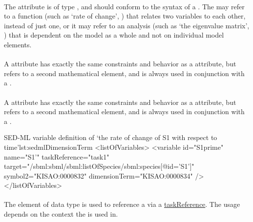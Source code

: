 \paragraph*{}
\label{sec:term}
The  attribute is of type , and should conform to the syntax of a \kisaoID.  The  may refer to a function (such as `rate of change', ) that relates two variables to each other, instead of just one, or it may refer to an analysis (such as `the eigenvalue matrix', ) that is dependent on the model as a whole and not on individual model elements.

\paragraph*{}
\label{sec:target2}
A  attribute has exactly the same constraints and behavior as a  attribute, but refers to a second mathematical element, and is always used in conjunction with a .

\paragraph*{}
\label{sec:symbol2}
A  attribute has exactly the same constraints and behavior as a  attribute, but refers to a second mathematical element, and is always used in conjunction with a .


\begin{myXmlLst}{SED-ML variable definition of `the rate of change of S1 with respect to time'}{lst:sedmlDimensionTerm}
<listOfVariables>
	<variable id="S1prime" name="S1'"  taskReference="task1"
		target="/sbml:sbml/sbml:listOfSpecies/sbml:species[@id='S1']"
		symbol2="KISAO:0000832"
		dimensionTerm="KISAO:0000834" />
</listOfVariables>
\end{myXmlLst}


\paragraph*{}
\label{sec:taskReferenceAttribute}
The  element of data type \SIdRef is used to reference a \Task via a \hyperref[sec:taskReference]{taskReference}. The usage depends on the context the \Variable is used in.

